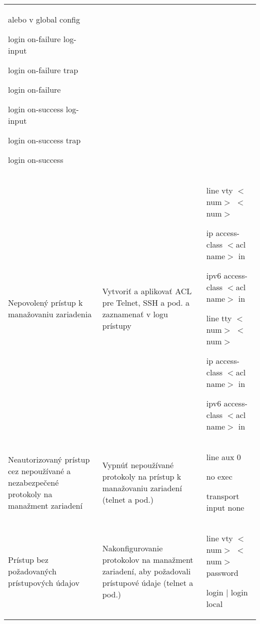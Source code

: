 \begin{longtable}[!htbp]{|L{10em}L{10em}L{34em}|}
	\vspace{0.5em}
	alebo v global config 
	\vspace{0.5em}
	
	login on-failure log-input
	
	login on-failure trap
	
	login on-failure
	
	login on-success log-input
	
	login on-success trap
	
	login on-success\\
	
	
	
	
	Nepovolený prístup k manažovaniu zariadenia	&Vytvoriť a aplikovať ACL pre Telnet, SSH a pod. a zaznamenať v logu prístupy	&line vty $<$num$>$ $<$num$>$
	
	\hspace{0.5em}ip access-class $<$acl name$>$ in
	
	\hspace{0.5em}ipv6 access-class $<$acl name$>$ in

	\vspace{0.5em}line tty $<$num$>$ $<$num$>$
	
	\hspace{0.5em}ip access-class $<$acl name$>$ in
	
	\hspace{0.5em}ipv6 access-class $<$acl name$>$ in\\
	
	
	
	
	
	Neautorizovaný prístup cez nepoužívané a nezabezpečené protokoly na manažment zariadení	&Vypnúť nepoužívané protokoly na prístup k manažovaniu zariadení (telnet a pod.)	&line aux 0
	
	\hspace{0.5em}no exec

	\hspace{0.5em}transport input none\\
	
	
	
	
	Prístup bez požadovaných prístupových údajov	&Nakonfigurovanie protokolov na manažment zariadení, aby požadovali prístupové údaje (telnet a pod.)	&line vty $<$num$>$ $<$num$>$
	\hspace{0.5em}password
	
	\hspace{0.5em}login | login local
	

\end{longtable}
